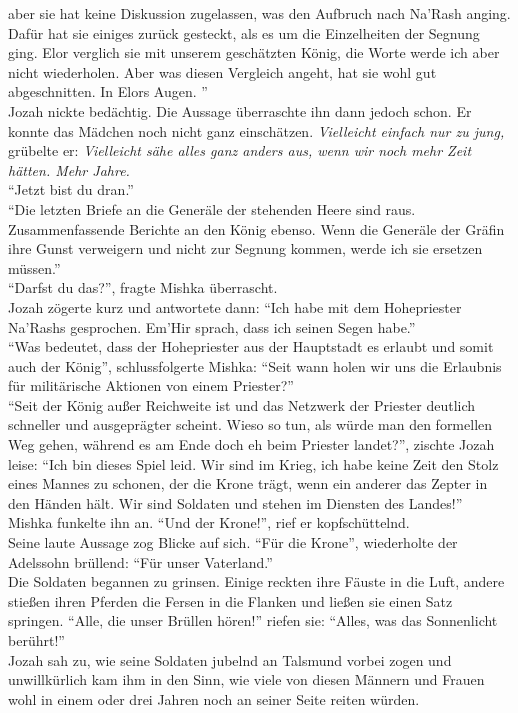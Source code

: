 aber sie hat keine Diskussion zugelassen, was den Aufbruch nach Na'Rash anging. Dafür hat sie 
einiges zurück gesteckt, als es um die Einzelheiten der Segnung ging. Elor verglich sie mit unserem 
geschätzten König, die Worte werde ich aber nicht wiederholen. Aber was diesen Vergleich angeht, 
hat sie wohl gut abgeschnitten. In Elors Augen. ''\\
Jozah nickte bedächtig. Die Aussage überraschte ihn dann jedoch schon. Er konnte das Mädchen noch 
nicht ganz einschätzen. \textit{Vielleicht einfach nur zu jung,} grübelte er: \textit{Vielleicht 
sähe alles ganz anders aus, wenn wir noch mehr Zeit hätten. Mehr Jahre.}\\
``Jetzt bist du dran.''\\
``Die letzten Briefe an die Generäle der stehenden Heere sind raus. Zusammenfassende Berichte an 
den König ebenso. Wenn die Generäle der Gräfin ihre Gunst verweigern und nicht zur Segnung kommen, 
werde ich sie ersetzen müssen.''\\
``Darfst du das?'', fragte Mishka überrascht.\\
Jozah zögerte kurz und antwortete dann: ``Ich habe mit dem Hohepriester Na'Rashs gesprochen. Em'Hir 
sprach, dass ich seinen Segen habe.''\\
``Was bedeutet, dass der Hohepriester aus der Hauptstadt es erlaubt und somit auch der König'', 
schlussfolgerte Mishka: ``Seit wann holen wir uns die Erlaubnis für militärische Aktionen von einem 
Priester?''\\
``Seit der König außer Reichweite ist und das Netzwerk der Priester deutlich schneller und 
ausgeprägter scheint. Wieso so tun, als würde man den formellen Weg gehen, während es am Ende doch 
eh beim Priester landet?'', zischte Jozah leise: ``Ich bin dieses Spiel leid. Wir sind im Krieg, 
ich habe keine Zeit den Stolz eines Mannes zu schonen, der die Krone trägt, wenn ein anderer das 
Zepter in den Händen hält. Wir sind Soldaten und stehen im Diensten des Landes!''\\
Mishka funkelte ihn an. ``Und der Krone!'', rief er kopfschüttelnd.\\
Seine laute Aussage zog Blicke auf sich. ``Für die Krone'', wiederholte der Adelssohn brüllend: 
``Für unser Vaterland.''\\
Die Soldaten begannen zu grinsen. Einige reckten ihre Fäuste in die Luft, andere stießen ihren 
Pferden die Fersen in die Flanken und ließen sie einen Satz springen. ``Alle, die 
unser Brüllen hören!'' riefen sie: ``Alles, was das Sonnenlicht berührt!''\\
Jozah sah zu, wie seine Soldaten jubelnd an Talsmund vorbei zogen und unwillkürlich kam ihm in den 
Sinn, wie viele von diesen Männern und Frauen wohl in einem oder drei Jahren noch an seiner Seite 
reiten würden.

